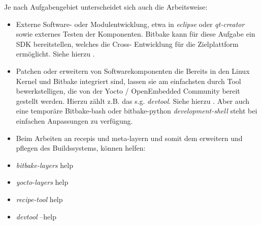Je nach Aufgabengebiet unterscheidet sich auch die Arbeitsweise:
\begin{itemize}
    \item Externe Software- oder Modulentwicklung, etwa in \textit{eclipse} oder
        \textit{qt-creator} sowie externes Testen der Komponenten. Bitbake kann
        für diese Aufgabe ein \acl{SDK} bereitstellen, welches die Cross-
        Entwicklung für die Ziel\-plattform ermöglicht. Siehe hierzu
        .
    \item Patchen oder erweitern von Software\-komponenten die Bereits in den
        Linux Kernel und Bitbake integriert sind, lassen sie am einfachsten durch
        Tool bewerkstelligen, die von der Yocto / OpenEmbedded Community bereit
        gestellt werden. Hierzu zählt z.B. das s.g. \textit{devtool}. Siehe
        hierzu . Aber auch eine temporäre
        Bitbake-bash oder bitbake-python \textit{development-shell} steht bei
        einfachen Anpassungen zu verfügung.
    \item Beim Arbeiten an recepis und meta-layern und somit dem erweitern und
        pflegen des Buildssystems, können helfen:
            \item \textit{bitbake-layers} help
            \item \textit{yocto-layers } help
            \item \textit{recipe-tool} help
            \item \textit{devtool } --help

\end{itemize}


